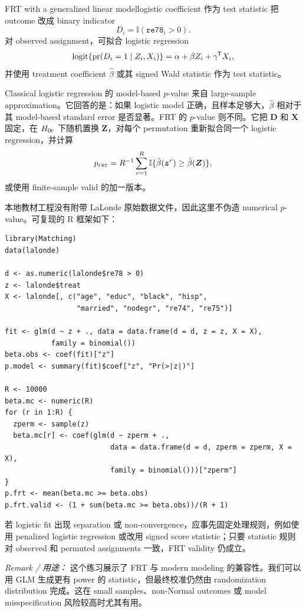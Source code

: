 \begin{exercisesolution}{FRT with a generalized linear model}{logistic coefficient 作为 test statistic}
把 outcome 改成 binary indicator
\[
D_i=\mathbb{I}(\texttt{re78}_i>0).
\]
对 observed assignment，可拟合 logistic regression
\[
\text{logit}\{\textup{pr}(D_i=1\mid Z_i,X_i)\}
=\alpha+\beta Z_i+\gamma^{\mkern-1.5mu\mathsf{T}} X_i,
\]
并使用 treatment coefficient $\hat\beta$ 或其 signed Wald statistic 作为 test statistic。

Classical logistic regression 的 model-based $p$-value 来自 large-sample approximation。它回答的是：如果 logistic model 正确，且样本足够大，$\hat\beta$ 相对于其 model-based standard error 是否显著。FRT 的 $p$-value 则不同。它把 $\boldsymbol{D}$ 和 $\boldsymbol{X}$ 固定，在 $H_{0\textsc{f}}$ 下随机置换 $\boldsymbol{Z}$，对每个 permutation 重新拟合同一个 logistic regression，并计算
\[
p_{\textsc{frt}}
=R^{-1}\sum_{r=1}^R
\mathbb{I}\{\hat\beta(\boldsymbol{z}^r)\geq \hat\beta(\boldsymbol{Z})\},
\]
或使用 finite-sample valid 的加一版本。

本地教材工程没有附带 LaLonde 原始数据文件，因此这里不伪造 numerical $p$-value。可复现的 R 框架如下：
\begin{lstlisting}
library(Matching)
data(lalonde)

d <- as.numeric(lalonde$re78 > 0)
z <- lalonde$treat
X <- lalonde[, c("age", "educ", "black", "hisp",
                 "married", "nodegr", "re74", "re75")]

fit <- glm(d ~ z + ., data = data.frame(d = d, z = z, X = X),
           family = binomial())
beta.obs <- coef(fit)["z"]
p.model <- summary(fit)$coef["z", "Pr(>|z|)"]

R <- 10000
beta.mc <- numeric(R)
for (r in 1:R) {
  zperm <- sample(z)
  beta.mc[r] <- coef(glm(d ~ zperm + .,
                         data = data.frame(d = d, zperm = zperm, X = X),
                         family = binomial()))["zperm"]
}
p.frt <- mean(beta.mc >= beta.obs)
p.frt.valid <- (1 + sum(beta.mc >= beta.obs))/(R + 1)
\end{lstlisting}
若 logistic fit 出现 separation 或 non-convergence，应事先固定处理规则，例如使用 penalized logistic regression 或改用 signed score statistic；只要 statistic 规则对 observed 和 permuted assignments 一致，FRT validity 仍成立。

\emph{Remark / 用途：} 这个练习展示了 FRT 与 modern modeling 的兼容性。我们可以用 GLM 生成更有 power 的 statistic，但最终校准仍然由 randomization distribution 完成。这在 small samples、non-Normal outcomes 或 model misspecification 风险较高时尤其有用。
\end{exercisesolution}

